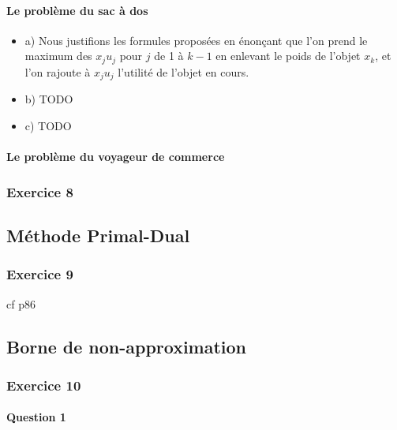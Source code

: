 \documentclass[a4paper, 12pt]{article}
\begin{document}
\paragraph{Le problème du sac à dos}
\begin{itemize}
\item a) Nous justifions les formules proposées en énonçant que l'on
  prend le maximum des $x_ju_j$ pour $j$ de 1 à $k-1$ en enlevant le
  poids de l'objet $x_k$, et l'on rajoute à $x_ju_j$ l'utilité de
  l'objet en cours.
\item b) TODO
\item c) TODO
\end{itemize}

\paragraph{Le problème du voyageur de commerce}

\subsubsection*{Exercice 8}

\subsection{Méthode Primal-Dual}

\subsubsection*{Exercice 9}

cf p86

\subsection{Borne de non-approximation}

\subsubsection*{Exercice 10}

\paragraph{Question 1}
\end{document}
